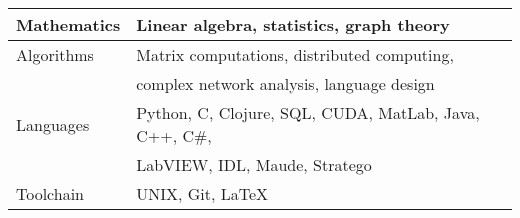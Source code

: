 \begin{tabular}{ | l | l | }
\hline                        
Mathematics  &  Linear algebra, statistics, graph theory                \\ 
\hline                        
Algorithms   &  Matrix computations, distributed computing,             \\
             &  complex network analysis, language design               \\
\hline                        
Languages    &  Python, C, Clojure, SQL, CUDA, MatLab, Java, C++, C\#,  \\
             &  LabVIEW, IDL, Maude, Stratego                           \\
\hline  
Toolchain    &  UNIX, Git, LaTeX                                        \\
\hline  
\end{tabular}


